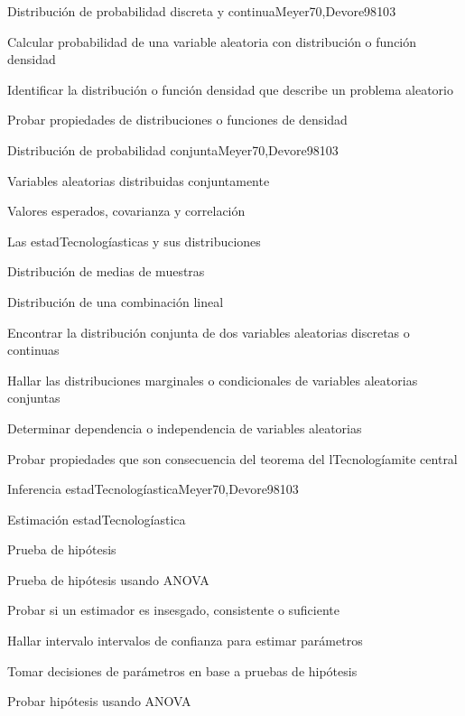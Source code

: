 \begin{syllabus}
\begin{unit}{Distribución de probabilidad discreta y continua}{Meyer70,Devore98}{10}{3}
   \begin{unitgoals}
      \item Calcular probabilidad de una variable aleatoria con distribución o función densidad
      \item Identificar la distribución o función densidad que describe un problema aleatorio
      \item Probar propiedades de distribuciones o funciones de densidad
   \end{unitgoals}
\end{unit}

\begin{unit}{Distribución de probabilidad conjunta}{Meyer70,Devore98}{10}{3}
\begin{topics}
      \item Variables aleatorias distribuidas conjuntamente
      \item Valores esperados, covarianza y correlación
      \item Las estadTecnologíasticas y sus distribuciones
      \item Distribución de medias de muestras
      \item Distribución de una combinación lineal

   \end{topics}
   \begin{unitgoals}
      \item Encontrar la distribución conjunta de dos variables aleatorias discretas o continuas
      \item Hallar las distribuciones marginales o condicionales de variables aleatorias conjuntas
      \item Determinar dependencia o independencia de variables aleatorias
      \item Probar propiedades que son consecuencia del teorema  del lTecnologíamite central
   \end{unitgoals}
\end{unit}

\begin{unit}{Inferencia estadTecnologíastica}{Meyer70,Devore98}{10}{3}
\begin{topics}
      \item Estimación estadTecnologíastica
      \item Prueba de hipótesis
      \item Prueba de hipótesis usando ANOVA
   \end{topics}

   \begin{unitgoals}
      \item Probar si un estimador es insesgado, consistente o suficiente
      \item Hallar intervalo intervalos de confianza para estimar parámetros
      \item Tomar decisiones de parámetros en base a pruebas de hipótesis
      \item Probar hipótesis usando ANOVA
   \end{unitgoals}
\end{unit}




\end{syllabus}
